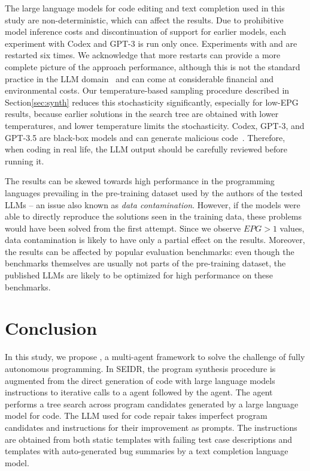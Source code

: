 The large language models for code editing and text completion used in this study are non-deterministic, 
which can affect the results. 
Due to prohibitive model inference costs and discontinuation of support for earlier models, each experiment with Codex and GPT-3 is run only once. 
Experiments with \llama{} and \gpt{} are restarted six times. 
We acknowledge that more restarts can provide a more complete picture of the approach performance,
although this is not the standard practice in the LLM domain~\cite{ouyang2023:llm} 
and can come at considerable financial and environmental costs.
Our temperature-based sampling procedure described in Section\ref{sec:synth} reduces this stochasticity significantly, especially for low-EPG results, because earlier solutions in the search tree are obtained with lower temperatures, and lower temperature limits the stochasticity.
Codex, GPT-3, and GPT-3.5 are black-box models and can generate malicious code~\cite{pearce2022:asleep}. 
Therefore, when coding in real life, the LLM output should be carefully reviewed before running it.

The results can be skewed towards high performance in the programming languages prevailing in the pre-training dataset used by the authors of the tested LLMs -- an issue also known as \emph{data contamination}.
However, if the models were able to directly reproduce the solutions seen in the training data, 
these problems would have been solved from the first attempt.
Since we observe $EPG>1$ values, data contamination is likely to have only a partial effect on the results.
Moreover, the results can be affected by popular evaluation benchmarks: even though the benchmarks themselves are usually not parts of the pre-training dataset, the published LLMs are likely to be optimized for high performance on these benchmarks.   

\section{Conclusion}
\label{sec:conclusion}

In this study, we propose \method{}, a multi-agent framework to solve the challenge of fully autonomous programming. 
In SEIDR, the program synthesis procedure is augmented from the direct generation of code with large language models instructions to iterative calls to a \debug{} agent followed by the \rank{} agent. 
The \debug{} agent performs a tree search across program candidates generated by a large language model for code.
The LLM used for code repair takes imperfect program candidates and instructions for their improvement as prompts. 
The instructions are obtained from both static templates with failing test case descriptions and templates with auto-generated bug summaries by a text completion language model. 

